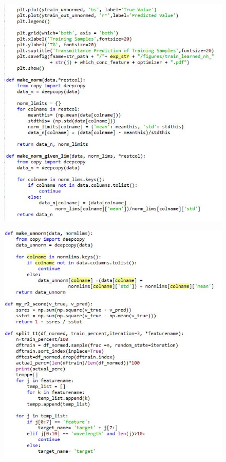 \documentclass[]{article}
\begin{document}
\begin{figure}
\centering
\includegraphics[width=1\textwidth,height=\textheight]{images/utilityflann2.jpg}
\end{figure}
\begin{figure}
\centering
\includegraphics[width=1\textwidth,height=\textheight]{images/utilityflann3.jpg}
\end{figure}
\end{document}
